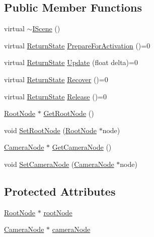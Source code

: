 \subsection*{Public Member Functions}
\begin{DoxyCompactItemize}
\item 
virtual \hyperlink{class_osiris_i_1_1_graphics_1_1_scenes_1_1_i_scene_afb52202950b6d7330be0128d7f7bf0e9}{$\sim$\-I\-Scene} ()
\item 
virtual \hyperlink{namespace_osiris_i_a8f53bf938dc75c65c6a529694514013e}{Return\-State} \hyperlink{class_osiris_i_1_1_graphics_1_1_scenes_1_1_i_scene_ae39743e96666cb61f5c709e7fdce2bd1}{Prepare\-For\-Activation} ()=0
\item 
virtual \hyperlink{namespace_osiris_i_a8f53bf938dc75c65c6a529694514013e}{Return\-State} \hyperlink{class_osiris_i_1_1_graphics_1_1_scenes_1_1_i_scene_a0ec3c381e07df175b5ba07780e4dfdfc}{Update} (float delta)=0
\item 
virtual \hyperlink{namespace_osiris_i_a8f53bf938dc75c65c6a529694514013e}{Return\-State} \hyperlink{class_osiris_i_1_1_graphics_1_1_scenes_1_1_i_scene_a44004804f2205ffca3fafdc06838b2fb}{Recover} ()=0
\item 
virtual \hyperlink{namespace_osiris_i_a8f53bf938dc75c65c6a529694514013e}{Return\-State} \hyperlink{class_osiris_i_1_1_graphics_1_1_scenes_1_1_i_scene_a2efed9668854529f6e8fcb43f07007ab}{Release} ()=0
\item 
\hyperlink{class_osiris_i_1_1_graphics_1_1_scenes_1_1_root_node}{Root\-Node} $\ast$ \hyperlink{class_osiris_i_1_1_graphics_1_1_scenes_1_1_i_scene_a7ae6e48c4d2e9d378f499c392314495f}{Get\-Root\-Node} ()
\item 
void \hyperlink{class_osiris_i_1_1_graphics_1_1_scenes_1_1_i_scene_abd91d6093320504cc438cc245f677251}{Set\-Root\-Node} (\hyperlink{class_osiris_i_1_1_graphics_1_1_scenes_1_1_root_node}{Root\-Node} $\ast$node)
\item 
\hyperlink{class_osiris_i_1_1_graphics_1_1_scenes_1_1_camera_node}{Camera\-Node} $\ast$ \hyperlink{class_osiris_i_1_1_graphics_1_1_scenes_1_1_i_scene_a91f82afbed174d2047b9110e008f895f}{Get\-Camera\-Node} ()
\item 
void \hyperlink{class_osiris_i_1_1_graphics_1_1_scenes_1_1_i_scene_aaf8fa2f93fa449701890613afc581831}{Set\-Camera\-Node} (\hyperlink{class_osiris_i_1_1_graphics_1_1_scenes_1_1_camera_node}{Camera\-Node} $\ast$node)
\end{DoxyCompactItemize}
\subsection*{Protected Attributes}
\begin{DoxyCompactItemize}
\item 
\hyperlink{class_osiris_i_1_1_graphics_1_1_scenes_1_1_root_node}{Root\-Node} $\ast$ \hyperlink{class_osiris_i_1_1_graphics_1_1_scenes_1_1_i_scene_a5f6c74ea4fbcd21332c8ead245ee1e44}{root\-Node}
\item 
\hyperlink{class_osiris_i_1_1_graphics_1_1_scenes_1_1_camera_node}{Camera\-Node} $\ast$ \hyperlink{class_osiris_i_1_1_graphics_1_1_scenes_1_1_i_scene_a6110c134bb387c2162830254594710ad}{camera\-Node}
\end{DoxyCompactItemize}


